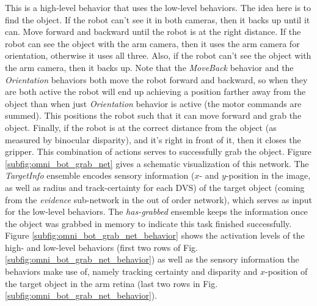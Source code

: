 This is a high-level behavior that uses the low-level behaviors.
The idea here is to find the object. If the robot can't see it in both cameras, then it backs up until it can. 
Move forward and backward until the robot is at the right distance. 
If the robot can see the object with the arm camera, then it uses the arm camera for orientation, otherwise it uses all three. 
Also, if the robot can't see the object with the arm camera, then it backs up. 
Note that the \emph{MoveBack} behavior and the \emph{Orientation} behaviors both move the robot forward and backward, so when they are both active the robot will end up achieving a position farther away from the object than when just \emph{Orientation} behavior is active (the motor commands are summed). 
This positions the robot such that it can move forward and grab the object. 
Finally, if the robot is at the correct distance from the object (as measured by binocular disparity), and it's right in front of it, then it closes the gripper. 
This combination of actions serves to successfully grab the object. 
Figure \ref{subfig:omni_bot_grab_net} gives a schematic visualization of this network.
The \emph{TargetInfo} ensemble encodes sensory information ($x$- and $y$-position in the image, as well as radius and track-certainty for each \ac{DVS}) of the target object (coming from the \emph{evidence} sub-network in the out of order network), which serves as input for the low-level behaviors.
The \emph{has-grabbed} ensemble keeps the information once the object was grabbed in memory to indicate this task finished successfully.
Figure \ref{subfig:omni_bot_grab_net_behavior} shows the activation levels of the high- and low-level behaviors (first two rows of Fig. \ref{subfig:omni_bot_grab_net_behavior}) as well as the sensory information the behaviors make use of, namely tracking certainty and disparity and $x$-position of the target object in the arm retina (last two rows in Fig. \ref{subfig:omni_bot_grab_net_behavior}). 

